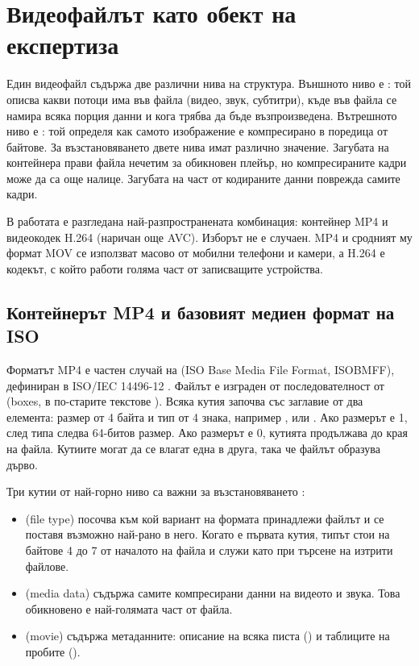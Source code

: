 \section{Видеофайлът като обект на експертиза}

Един видеофайл съдържа две различни нива на структура. Външното ниво е
: той описва какви потоци има във файла (видео, звук, субтитри),
къде във файла се намира всяка порция данни и кога трябва да бъде възпроизведена.
Вътрешното ниво е : той определя как самото изображение е компресирано
в поредица от байтове. За възстановяването двете нива имат различно значение. Загубата
на контейнера прави файла нечетим за обикновен плейър, но компресираните кадри може
да са още налице. Загубата на част от кодираните данни поврежда самите кадри.

В работата е разгледана най-разпространената комбинация: контейнер MP4 и видеокодек
H.264 (наричан още AVC). Изборът не е случаен. MP4 и сродният му формат MOV се
използват масово от мобилни телефони и камери, а H.264 е кодекът, с който работи
голяма част от записващите устройства.

\subsection{Контейнерът MP4 и базовият медиен формат на ISO}

Форматът MP4 \cite{iso14496_14} е частен случай на  (ISO Base Media File Format, ISOBMFF), дефиниран в ISO/IEC 14496-12
\cite{iso14496_12}. Файлът е изграден от последователност от  (boxes, в
по-старите текстове ). Всяка кутия започва със заглавие от два елемента:
размер от 4 байта и тип от 4 знака, например ,  или .
Ако размерът е 1, след типа следва 64-битов размер. Ако размерът е 0, кутията
продължава до края на файла. Кутиите могат да се влагат една в друга, така че файлът
образува дърво.

Три кутии от най-горно ниво са важни за възстановяването :

\begin{itemize}[leftmargin=2cm]
  \item {} (file type) посочва към кой вариант на формата принадлежи файлът
        и се поставя възможно най-рано в него. Когато е първата кутия, типът
         стои на байтове 4 до 7 от началото на файла и служи като
         при търсене на изтрити файлове.
  \item {} (media data) съдържа самите компресирани данни на видеото и
        звука. Това обикновено е най-голямата част от файла.
  \item {} (movie) съдържа метаданните: описание на всяка писта
        () и таблиците на пробите ().
\end{itemize}

